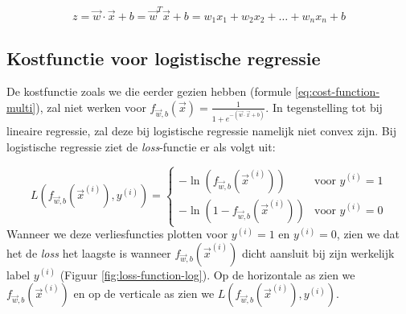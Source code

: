 \begin{equation}
	z = \vec{w} \cdot \vec{x} + b = \vec{w}^{T}\vec{x} + b = w_{1}x_{1} + w_{2}x_{2} + \ldots + w_{n}x_{n} + b
\end{equation}

\subsection{Kostfunctie voor logistische regressie}

De kostfunctie zoals we die eerder gezien hebben (formule \ref{eq:cost-function-multi}), zal niet werken voor $f_{\vec{w},b}(\vec{x}) = \frac{1}{1 + e^{-(\vec{w} \cdot \vec{x} + b)}}$. In tegenstelling tot bij lineaire regressie, zal deze bij logistische regressie namelijk niet convex zijn. Bij logistische regressie ziet de \textit{loss}-functie er als volgt uit:

 \begin{equation}
 	L(f_{\vec{w},b}(\vec{x}^{(i)}), y^{(i)}) = \left\{ \begin{matrix} -\ln(f_{\vec{w},b}(\vec{x}^{(i)})) & \mbox{voor } y^{(i)} = 1 \\ -\ln(1 - f_{\vec{w},b}(\vec{x}^{(i)}))  & \mbox{voor } y^{(i)} = 0 \end{matrix}\right .
 	\label{eq:loss-function-log}
 \end{equation}
\noindent
Wanneer we deze verliesfuncties plotten voor $y^{(i)} = 1$ en $y^{(i)} = 0$, zien we dat het de \textit{loss} het laagste is wanneer $f_{\vec{w},b}(\vec{x}^{(i)})$ dicht aansluit bij zijn werkelijk label $y^{(i)}$ (Figuur \ref{fig:loss-function-log}). Op de horizontale as zien we $f_{\vec{w},b}(\vec{x}^{(i)})$ en op de verticale as zien we $L(f_{\vec{w},b}(\vec{x}^{(i)}), y^{(i)})$.

